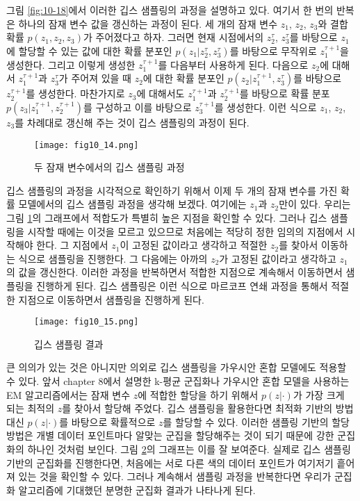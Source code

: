\documentclass[a4paper]{oblivoir}
\begin{document}
그림 \ref{fig:10-18}에서 이러한 깁스 샘플링의 과정을 설명하고 있다. 여기서 한 번의 반복은 하나의 잠재 변수 값을 갱신하는 과정이 된다. 세 개의 잠재 변수 $z_1$, $z_2$, $z_3$와 결합 확률 $p(z_1, z_2, z_3)$가 주어졌다고 하자. 그러면 현재 시점에서의 $z_2^{\tau}$, $z_3^{\tau}$를 바탕으로 $z_1$에 할당할 수 있는 값에 대한 확률 분포인 $p(z_1 | z_2^{\tau}, z_3^{\tau})$를 바탕으로 무작위로 $z_1^{\tau+1}$을 생성한다. 그리고 이렇게 생성한 $z_1^{\tau+1}$를 다음부터 사용하게 된다. 다음으로 $z_2$에 대해서 $z_1^{\tau+1}$과 $z_3^{\tau}$가 주어져 있을 때 $z_2$에 대한 확률 분포인 $p(z_2 | z_1^{\tau+1}, z_3^{\tau})$를 바탕으로 $z_2^{\tau+1}$를 생성한다. 마찬가지로 $z_3$에 대해서도 $z_1^{\tau+1}$과 $z_2^{\tau+1}$를 바탕으로 확률 분포 $p(z_3 | z_1^{\tau+1}, z_2^{\tau+1})$를 구성하고 이를 바탕으로 $z_3^{\tau+1}$를 생성한다. 이런 식으로 $z_1$, $z_2$, $z_3$를 차례대로 갱신해 주는 것이 깁스 샘플링의 과정이 된다.\\

\begin{figure}[ht] \centering 
\texttt{[image: fig10\_14.png]} 
\caption{두 잠재 변수에서의 깁스 샘플링 과정}
\label{fig:10-15}
\end{figure}

깁스 샘플링의 과정을 시각적으로 확인하기 위해서 이제 두 개의 잠재 변수를 가진 확률 모델에서의 깁스 샘플링 과정을 생각해 보겠다. 여기에는  $z_1$과 $z_2$만이 있다. 우리는 그림 \ref{fig:10-15}의 그래프에서 적합도가 특별히 높은 지점을 확인할 수 있다. 그러나 깁스 샘플링을 시작할 때에는 이것을 모르고 있으므로 처음에는 적당히 정한 임의의 지점에서 시작해야 한다. 그 지점에서 $z_1$이 고정된 값이라고 생각하고 적절한 $z_2$를 찾아서 이동하는 식으로 샘플링을 진행한다. 그 다음에는 아까의 $z_2$가 고정된 값이라고 생각하고 $z_1$의 값을 갱신한다. 이러한 과정을 반복하면서 적합한 지점으로 계속해서 이동하면서 샘플링을 진행하게 된다. 깁스 샘플링은 이런 식으로 마르코프 연쇄 과정을 통해서 적절한 지점으로 이동하면서 샘플링을 진행하게 된다. \\

\begin{figure}[ht] \centering 
\texttt{[image: fig10\_15.png]} 
\caption{깁스 샘플링 결과}
\label{fig:10-16}
\end{figure}

큰 의의가 있는 것은 아니지만 의외로 깁스 샘플링을 가우시안 혼합 모델에도 적용할 수 있다. 앞서 chapter 8에서 설명한 k-평균 군집화나 가우시안 혼합 모델을 사용하는 EM 알고리즘에서는 잠재 변수 $z$에 적합한 할당을 하기 위해서 $p(z|\cdot)$가 가장 크게 되는 최적의 $z$를 찾아서 할당해 주었다. 깁스 샘플링을 활용한다면 최적화 기반의 방법 대신 $p(z|\cdot)$를 바탕으로 확률적으로 $z$를 할당할 수 있다. 이러한 샘플링 기반의 할당 방법은 개별 데이터 포인트마다 알맞는 군집을 할당해주는 것이 되기 때문에 강한 군집화의 하나인 것처럼 보인다. 그림 \ref{fig:10-16}의 그래프는 이를 잘 보여준다. 실제로 깁스 샘플링 기반의 군집화를 진행한다면, 처음에는 서로 다른 색의 데이터 포인트가 여기저기 흩어져 있는 것을 확인할 수 있다. 그러나 계속해서 샘플링 과정을 반복한다면 우리가 군집화 알고리즘에 기대했던 분명한 군집화 결과가 나타나게 된다. \\
\end{document}

